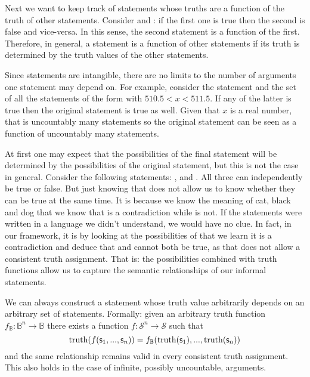\documentclass[11pt,letterpaper,fleqn]{memoir} %
\begin{document}
Next we want to keep track of statements whose truths are a function of the truth of other statements. Consider  and : if the first one is true then the second is false and vice-versa. In this sense, the second statement is a function of the first. Therefore, in general, a statement is a function of other statements if its truth is determined by the truth values of the other statements.

Since statements are intangible, there are no limits to the number of arguments one statement may depend on. For example, consider the statement  and the set of all the statements of the form  with $510.5 < x < 511.5$. If any of the latter is true then the original statement is true as well. Given that $x$ is a real number, that is uncountably many statements so the original statement can be seen as a function of uncountably many statements.

At first one may expect that the possibilities of the final statement will be determined by the possibilities of the original statement, but this is not the case in general. Consider the following statements: ,  and . All three can independently be true or false. But just knowing that does not allow us to know whether they can be true at the same time. It is because we know the meaning of cat, black and dog that we know that  is a contradiction while  is not. If the statements were written in a language we didn't understand, we would have no clue. In fact, in our framework, it is by looking at the possibilities of  that we learn it is a contradiction and deduce that  and  cannot both be true, as that does not allow a consistent truth assignment. That is: the possibilities combined with truth functions allow us to capture the semantic relationships of our informal statements.

\begin{mathSection}

	\begin{axiom}\label{ax_functions_of_statement}
		We can always construct a statement whose truth value arbitrarily depends on an arbitrary set of statements. Formally: given an arbitrary truth function $f_{\mathbb{B}} : \mathbb{B}^n \to \mathbb{B}$ there exists a function $f : \mathcal{S}^n \to \mathcal{S}$ such that
		$$\operatorname{truth}(f(\mathsf{s}_1, ..., \mathsf{s}_n)) = f_{\mathbb{B}}(\operatorname{truth}(\mathsf{s}_1), ..., \operatorname{truth}(\mathsf{s}_n))$$
		and the same relationship remains valid in every consistent truth assignment. This also holds in the case of infinite, possibly uncountable, arguments.
	\end{axiom}
\end{mathSection}
\end{document}
